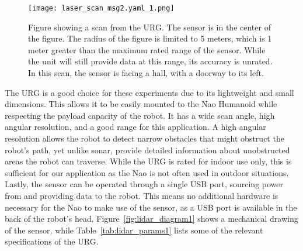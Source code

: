 \begin{figure}
\centering
\texttt{[image: laser\_scan\_msg2.yaml\_1.png]}
\caption{Figure showing a scan from the URG\@.
         The sensor is in the center of the figure.
         The radius of the figure is limited to 5 meters, which is 1 meter 
         greater than the maximum rated range of the sensor. While the unit will
         still provide data at this range, its accuracy is unrated.
         In this scan, the sensor is facing a hall, with a doorway to its left.}
\label{fig:lidar_scan1}
\end{figure}

The URG is a good choice for these experiments due to its lightweight and small
dimensions. This allows it to be easily mounted to the Nao Humanoid while
respecting the payload capacity of the robot. It has a wide scan angle, high
angular resolution, and a good range for this application. A high angular
resolution allows the robot to detect narrow obstacles that might obstruct the
robot's path, yet unlike sonar, provide detailed information about unobstructed
areas the robot can traverse. While the URG is rated for indoor use only, this
is sufficient for our application as the Nao is not often used in outdoor 
situations. Lastly, the sensor can be operated through a single USB port,
sourcing power from and providing data to the robot. This means no additional hardware is 
necessary for the Nao to make use of the sensor, as a USB port is available
in the back of the robot's head.
Figure~\ref{fig:lidar_diagram1} shows a mechanical drawing of the sensor, while
Table~\ref{tab:lidar_params1} lists some of the relevant specifications of the
URG.

